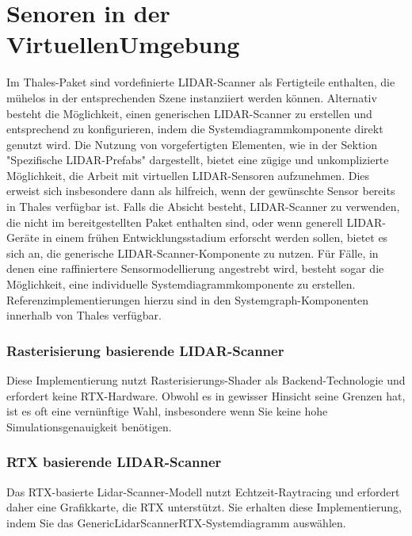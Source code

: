 \section{Senoren in der VirtuellenUmgebung}
Im Thales-Paket sind vordefinierte LIDAR-Scanner als Fertigteile enthalten, die mühelos in der entsprechenden Szene instanziiert werden können. Alternativ besteht die Möglichkeit, einen generischen LIDAR-Scanner zu erstellen und entsprechend zu konfigurieren, indem die Systemdiagrammkomponente direkt genutzt wird. Die Nutzung von vorgefertigten Elementen, wie in der Sektion "Spezifische LIDAR-Prefabs" dargestellt, bietet eine zügige und unkomplizierte Möglichkeit, die Arbeit mit virtuellen LIDAR-Sensoren aufzunehmen. Dies erweist sich insbesondere dann als hilfreich, wenn der gewünschte Sensor bereits in Thales verfügbar ist. Falls die Absicht besteht, LIDAR-Scanner zu verwenden, die nicht im bereitgestellten Paket enthalten sind, oder wenn generell LIDAR-Geräte in einem frühen Entwicklungsstadium erforscht werden sollen, bietet es sich an, die generische LIDAR-Scanner-Komponente zu nutzen. Für Fälle, in denen eine raffiniertere Sensormodellierung angestrebt wird, besteht sogar die Möglichkeit, eine individuelle Systemdiagrammkomponente zu erstellen. Referenzimplementierungen hierzu sind in den Systemgraph-Komponenten innerhalb von Thales verfügbar.\\

\subsubsection*{Rasterisierung basierende LIDAR-Scanner}

Diese Implementierung nutzt Rasterisierungs-Shader als Backend-Technologie und erfordert keine RTX-Hardware. Obwohl es in gewisser Hinsicht seine Grenzen hat, ist es oft eine vernünftige Wahl, insbesondere wenn Sie keine hohe Simulationsgenauigkeit benötigen.\\
\subsubsection*{RTX basierende LIDAR-Scanner}
Das RTX-basierte Lidar-Scanner-Modell nutzt Echtzeit-Raytracing und erfordert daher eine Grafikkarte, die RTX unterstützt. Sie erhalten diese Implementierung, indem Sie das GenericLidarScannerRTX-Systemdiagramm auswählen.\\

%
